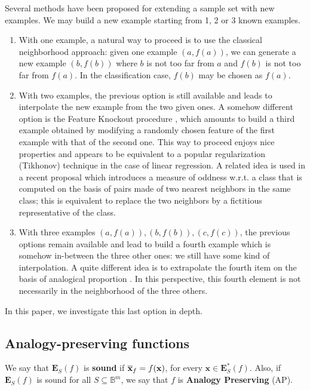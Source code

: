 Several methods have been proposed for extending a sample set with new
examples. We may build a new example starting from
1, 2 or 3 known examples.
\begin{enumerate}
\item With one example, a natural way to proceed is to use the classical
  neighborhood approach: given one  example $(a,f(a))$, we can generate a new
    example $(b,f(b))$ where  $b$ is not too far from $a$ and $f(b)$ is not too
    far from $f(a)$. In the classification case, $f(b)$ may be chosen as
    $f(a)$.
\item With two examples, the previous option is still available and leads to
  interpolate the new example from the two given ones.  A somehow different
    option is the Feature Knockout procedure \cite{WolMar04}, which amounts
    to build a third example obtained by modifying a randomly chosen feature
    of the first example with that of the second one.  This way to
    proceed enjoys nice properties and appears to be equivalent to a popular
    regularization (Tikhonov) technique in the case of linear regression.  A
    related idea is used in a recent proposal \cite{BouPraRicECAI16} which
    introduces a measure of oddness w.r.t. a class that is computed on the
    basis of pairs made of two nearest neighbors in the same class; this is
    equivalent to replace the two neighbors by a fictitious representative of
    the class.

\item With three examples $(a,f(a)), (b,f(b)), (c,f(c))$, the previous options
  remain available and lead to build a fourth example which is somehow
    in-between the three other ones: we still have some kind of interpolation.
    A quite different idea is to extrapolate the fourth item on the basis of
    analogical proportion \cite{BayMouMicAnqECML07}.  In this perspective,
    this fourth element is not necessarily in the neighborhood of the three
    others.
\end{enumerate}
In this paper, we investigate this last option in depth.

\subsection{Analogy-preserving functions}\label{analogy-preserv}

\begin{definition}
  We say that $\mathbf{E}_S(f)$ is {\bf sound} if
  $\overline{\mathbf{x}}_f=f(\mathbf{x})$, for every $\mathbf{x} \in
  \mathbf{E}^*_S(f)$. Also, if $\mathbf{E}_S(f)$ is sound for all $S \subseteq
  \mathbb{B}^m$, we say that $f$ is {\bf Analogy Preserving} (AP).
\end{definition}

